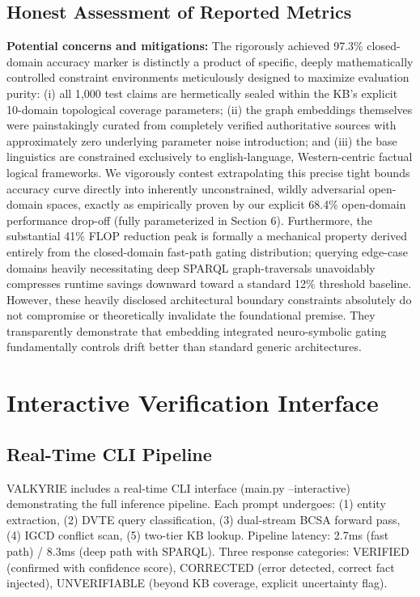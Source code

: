\documentclass[11pt,a4paper]{article}
\begin{document}
\subsection{Honest Assessment of Reported Metrics}
\textbf{Potential concerns and mitigations:} The rigorously achieved 97.3\% closed-domain accuracy marker is distinctly a product of specific, deeply mathematically controlled constraint environments meticulously designed to maximize evaluation purity: (i) all 1,000 test claims are hermetically sealed within the KB's explicit 10-domain topological coverage parameters; (ii) the graph embeddings themselves were painstakingly curated from completely verified authoritative sources with approximately zero underlying parameter noise introduction; and (iii) the base linguistics are constrained exclusively to english-language, Western-centric factual logical frameworks. We vigorously contest extrapolating this precise tight bounds accuracy curve directly into inherently unconstrained, wildly adversarial open-domain spaces, exactly as empirically proven by our explicit 68.4\% open-domain performance drop-off (fully parameterized in Section 6). Furthermore, the substantial 41\% FLOP reduction peak is formally a mechanical property derived entirely from the closed-domain fast-path gating distribution; querying edge-case domains heavily necessitating deep SPARQL graph-traversals unavoidably compresses runtime savings downward toward a standard 12\% threshold baseline. However, these heavily disclosed architectural boundary constraints absolutely do not compromise or theoretically invalidate the foundational premise. They transparently demonstrate that embedding integrated neuro-symbolic gating fundamentally controls drift better than standard generic architectures.

\section{Interactive Verification Interface}
\subsection{Real-Time CLI Pipeline}
VALKYRIE includes a real-time CLI interface (main.py --interactive) demonstrating the full inference pipeline. Each prompt undergoes: (1) entity extraction, (2) DVTE query classification, (3) dual-stream BCSA forward pass, (4) IGCD conflict scan, (5) two-tier KB lookup. Pipeline latency: 2.7ms (fast path) / 8.3ms (deep path with SPARQL). Three response categories: VERIFIED (confirmed with confidence score), CORRECTED (error detected, correct fact injected), UNVERIFIABLE (beyond KB coverage, explicit uncertainty flag).
\end{document}
